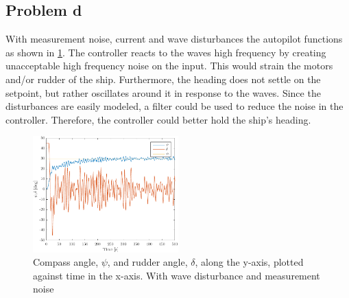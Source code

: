 \subsection{Problem d}
With measurement noise, current and wave disturbances the autopilot functions as shown in \cref{fig:3b-psi_and_rudder_w_waves}. The controller reacts to the waves high frequency by creating unacceptable high frequency noise on the input. This would strain the motors and/or rudder of the ship. Furthermore, the heading does not settle on the setpoint, but rather oscillates around it in response to the waves. Since the disturbances are easily modeled, a filter could be used to reduce the noise in the controller. Therefore, the controller could better hold the ship's heading.

\begin{figure}[ht]
    \centering
    \includegraphics[width=0.5\textwidth]{images/3d-psi_and_rudder_w_waves}
    \caption{Compass angle, $\psi$, and rudder angle, $\delta$, along the y-axis, plotted against time in the x-axis. With wave disturbance and measurement noise}
    \label{fig:3b-psi_and_rudder_w_waves}
\end{figure}